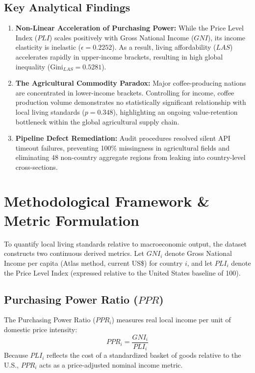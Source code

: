 \documentclass[11pt,a4paper]{article}
\begin{document}
\subsection{Key Analytical Findings}
\begin{enumerate}[leftmargin=1.5em]
    \item \textbf{Non-Linear Acceleration of Purchasing Power:} While the Price Level Index ($PLI$) scales positively with Gross National Income ($GNI$), its income elasticity is inelastic ($\epsilon = 0.2252$). As a result, living affordability ($LAS$) accelerates rapidly in upper-income brackets, resulting in high global inequality ($\text{Gini}_{LAS} = 0.5281$).
    \item \textbf{The Agricultural Commodity Paradox:} Major coffee-producing nations are concentrated in lower-income brackets. Controlling for income, coffee production volume demonstrates no statistically significant relationship with local living standards ($p = 0.348$), highlighting an ongoing value-retention bottleneck within the global agricultural supply chain.
    \item \textbf{Pipeline Defect Remediation:} Audit procedures resolved silent API timeout failures, preventing 100\% missingness in agricultural fields and eliminating 48 non-country aggregate regions from leaking into country-level cross-sections.
\end{enumerate}


\section{Methodological Framework \& Metric Formulation}


To quantify local living standards relative to macroeconomic output, the dataset constructs two continuous derived metrics. Let $GNI_i$ denote Gross National Income per capita (Atlas method, current US\$) for country $i$, and let $PLI_i$ denote the Price Level Index (expressed relative to the United States baseline of 100).

\subsection{Purchasing Power Ratio ($PPR$)}
The Purchasing Power Ratio ($PPR_i$) measures real local income per unit of domestic price intensity:
\begin{equation}
PPR_i = \frac{GNI_i}{PLI_i}
\end{equation}
Because $PLI_i$ reflects the cost of a standardized basket of goods relative to the U.S., $PPR_i$ acts as a price-adjusted nominal income metric.
\end{document}
